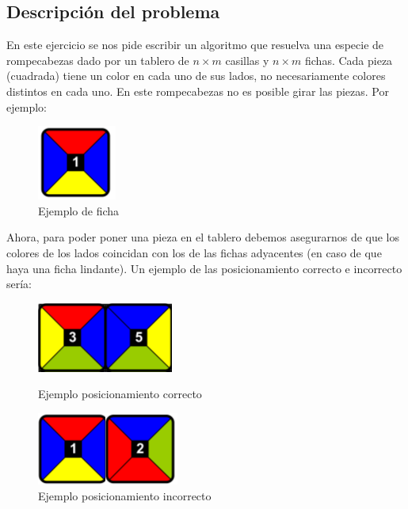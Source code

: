 \subsection{Descripci\'on del problema}

En este ejercicio se nos pide escribir un algoritmo que resuelva una especie de rompecabezas dado por un tablero de $n \times m$ casillas y $n \times m$ fichas.
Cada pieza (cuadrada) tiene un color en cada uno de sus lados, no necesariamente colores distintos en cada uno. En este rompecabezas no es posible girar las piezas. Por ejemplo: 

\begin{figure}[h]
\begin{center}
\includegraphics[scale=0.4]{./img/ej3_fichas.png}
\caption{Ejemplo de ficha}
\end{center}
\end{figure}

Ahora, para poder poner una pieza en el tablero debemos asegurarnos de que los colores de los lados coincidan con los de las fichas adyacentes (en caso de que haya una ficha lindante). Un ejemplo de las posicionamiento correcto e incorrecto ser\'ia:\\

\begin{figure}[h]
\begin{center}
\includegraphics[scale=0.4]{./img/ej3_fichas_coinciden.png}
\caption{Ejemplo posicionamiento correcto}
\includegraphics[scale=0.4]{./img/ej3_fichas_ncoinciden.png}
\caption{Ejemplo posicionamiento incorrecto}
\end{center}
\end{figure}

